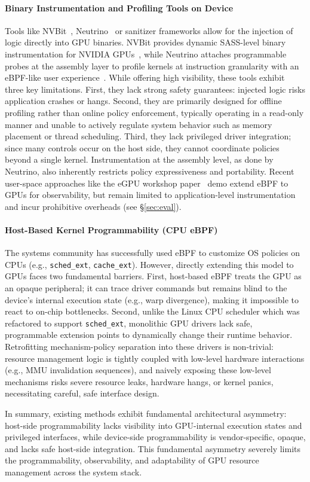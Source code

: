 \paragraph{Binary Instrumentation and Profiling Tools on Device}
Tools like NVBit~\cite{nvbit}, Neutrino~\cite{neutrino} or sanitizer frameworks allow for the injection of logic directly into GPU binaries. NVBit provides dynamic SASS-level binary instrumentation for NVIDIA GPUs~\cite{nvbit}, while Neutrino attaches programmable probes at the assembly layer to profile kernels at instruction granularity with an eBPF-like user experience~\cite{neutrino}. While offering high visibility, these tools exhibit three key limitations. First, they lack strong safety guarantees: injected logic risks application crashes or hangs. Second, they are primarily designed for offline profiling rather than online policy enforcement, typically operating in a read-only manner and unable to actively regulate system behavior such as memory placement or thread scheduling. Third, they lack privileged driver integration; since many controls occur on the host side, they cannot coordinate policies beyond a single kernel. Instrumentation at the assembly level, as done by Neutrino, also inherently restricts policy expressiveness and portability. Recent user-space approaches like the eGPU workshop paper~\cite{egpu} demo extend eBPF to GPUs for observability, but remain limited to application-level instrumentation and incur prohibitive overheads (see \S\ref{sec:eval}).

\paragraph{Host-Based Kernel Programmability (CPU eBPF)}
The systems community has successfully used eBPF to customize OS policies on CPUs (e.g., \texttt{sched\_ext}, \texttt{cache\_ext}). However, directly extending this model to GPUs faces two fundamental barriers. First, host-based eBPF treats the GPU as an opaque peripheral; it can trace driver commands but remains blind to the device's internal execution state (e.g., warp divergence), making it impossible to react to on-chip bottlenecks. Second, unlike the Linux CPU scheduler which was refactored to support \texttt{sched\_ext}, monolithic GPU drivers lack safe, programmable extension points to dynamically change their runtime behavior. Retrofitting mechanism-policy separation into these drivers is non-trivial: resource management logic is tightly coupled with low-level hardware interactions (e.g., MMU invalidation sequences), and naively exposing these low-level mechanisms risks severe resource leaks, hardware hangs, or kernel panics, necessitating careful, safe interface design.

In summary, existing methods exhibit fundamental architectural asymmetry: host-side programmability lacks visibility into GPU-internal execution states and privileged interfaces, while device-side programmability is vendor-specific, opaque, and lacks safe host-side integration. This fundamental asymmetry severely limits the programmability, observability, and adaptability of GPU resource management across the system stack.
